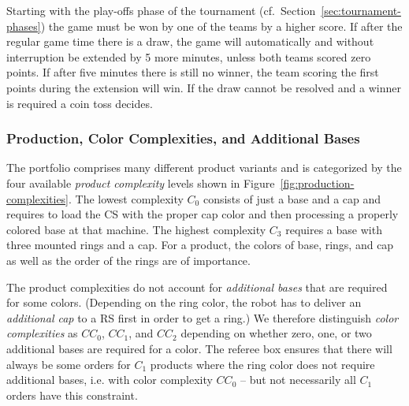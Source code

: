 \documentclass[12pt,twoside]{article}
\newcommand{\refsec}[1]{Section~\ref{#1}}
\newcommand{\reffig}[1]{Figure~\ref{#1}}
\begin{document}
Starting with the play-offs phase of the tournament
(cf.~\refsec{sec:tournament-phases}) the game must be won by one of
the teams by a higher score. If after the regular game time there is a
draw, the game will automatically and without interruption be extended
by 5 more minutes, unless both teams scored zero points. If after five
minutes there is still no winner, the team scoring the first points
during the extension will win. If the draw cannot be resolved and a
winner is required a coin toss decides.

\subsubsection{Production, Color Complexities, and Additional Bases}
\label{sec:production-complexities}
The portfolio comprises many different product variants and is
categorized by the four available \emph{product complexity} levels
shown in \reffig{fig:production-complexities}. The lowest complexity
$C_0$ consists of just a base and a cap and requires to load the CS
with the proper cap color and then processing a properly colored base
at that machine. The highest complexity $C_3$ requires a base with
three mounted rings and a cap. For a product, the colors of base,
rings, and cap as well as the order of the rings are of importance.

The product complexities do not account for \emph{additional bases}
that are required for some colors. (Depending on the ring color, the 
robot has to deliver an \emph{additional cap} to a RS first in order 
to get a ring.) 
We therefore distinguish \emph{color complexities} as $CC_0$, $CC_1$, 
and $CC_2$ depending on whether zero, one, or two additional bases are 
required for a color. The referee box ensures that there will always be 
some orders for $C_1$ products where the ring color does not require 
additional bases, i.e. with color complexity $CC_0$ -- but not necessarily 
all $C_1$ orders have this constraint.
\end{document}
